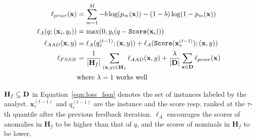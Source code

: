 \documentclass{article}
\begin{document}
\begin{align}
\ell_{prior}({\bf x}) &= \sum_{m=1}^M{-b\log(p_m({\bf x})) -(1 - b)\log(1 - p_m({\bf x}))} \label{eqn:prior} \\
\ell_A(q; ({\bf x}_i, y_i)) &= \max(0, y_i (q - \text{\texttt{Score}$({\bf x}_i)$})) \label{eqn:la_loss} \\
\ell_{AAD}({\bf x}, y) &= \ell_A(q_{\tau}^{(t-1)}; ({\bf x}, y)) + \ell_A(\text{\texttt{Score}}({\bf x}_{\tau}^{(t-1)}); ({\bf x}, y)) \label{eqn:aad_loss} \\
\ell_{FSSN} &= \frac{1}{|{\bf H}_f|} \sum_{({\bf x}, y) \in {\bf H}_f} \ell_{AAD}({\bf x}, y) + \frac{\lambda}{|{\bf D}|} \sum_{{\bf x} \in {\bf D}}\ell_{prior}({\bf x}) \label{eqn:loss_fssn} \\
& \text{where $\lambda=1$ works well} \nonumber
\end{align}

$\mathbf{H}_f \subseteq {\bf D}$ in Equation~\ref{eqn:loss_fssn} denotes the set of instances labeled by the analyst. ${\mathbf x}_{\tau}^{(t-1)}$ and $q_{\tau}^{(t-1)}$ are the instance and the score resp. ranked at the $\tau$-th quantile after the previous feedback iteration. $\ell_{A}$ encourages the scores of anomalies in $\mathbf{H}_f$ to be higher than that of $q$, and the scores of nominals in $\mathbf{H}_f$ to be lower.
\end{document}
